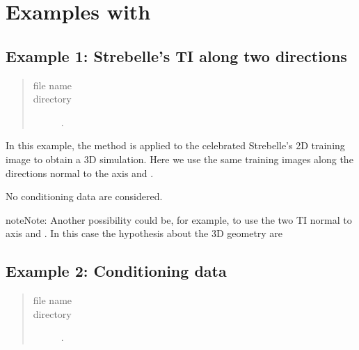 \documentclass[letterpaper,10pt,english]{sphinxmanual}
\begin{document}
\begin{sphinxVerbatim}[commandchars=\\\{\}]
\end{sphinxVerbatim}


\section{Examples with }
\label{\detokenize{examples:examples-with-deesse}}

\subsection{Example 1: Strebelle’s TI along two directions}
\label{\detokenize{examples:example-1-strebelle-s-ti-along-two-directions}}\begin{quote}\begin{description}
\item[{file name}] \leavevmode
{}

\item[{directory}] \leavevmode
{}.

\end{description}\end{quote}

In this example, the  method is applied to the celebrated
Strebelle’s 2D training image to obtain a 3D simulation.
Here we use the same training images along the directions normal to the axis
 and .

No conditioning data are considered.

\begin{sphinxadmonition}{note}{Note:}
Another possibility could be, for example, to use the two TI normal to
axis  and . In this case the hypothesis about the 3D geometry are
\end{sphinxadmonition}


\subsection{Example 2: Conditioning data}
\label{\detokenize{examples:example-2-conditioning-data}}\begin{quote}\begin{description}
\item[{file name}] \leavevmode
{}

\item[{directory}] \leavevmode
{}.

\end{description}\end{quote}
\end{document}
